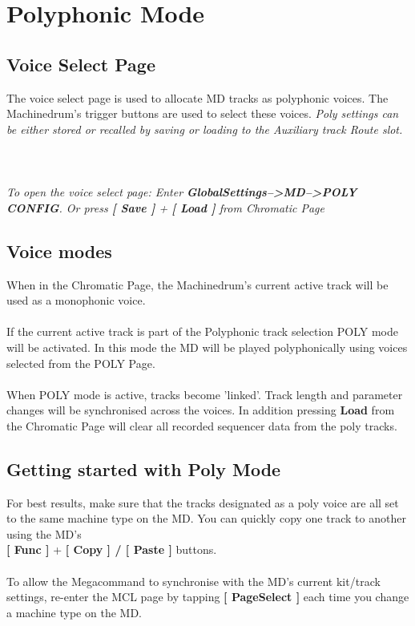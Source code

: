 \chapter{Polyphonic Mode}

\section{Voice Select Page}
The voice select page is used to allocate MD tracks as polyphonic voices.
The Machinedrum's trigger buttons are used to select these voices.
\textit{Poly settings can be either stored or recalled by saving or loading to the Auxiliary track Route slot.}\\\\
\\\\
\textit{To open the voice select page: Enter \textbf{GlobalSettings-->MD-->POLY CONFIG}. Or press \textbf{[ Save ]} + \textbf{[ Load ]} from  Chromatic Page}
\section{Voice modes}

When in the Chromatic Page, the Machinedrum's current active track will be used as a monophonic voice.\\
\\
If the current active track is part of the Polyphonic track selection POLY mode will be activated. In this mode the MD will be played polyphonically using voices selected from the POLY Page.\\
\\
When POLY mode is active, tracks become 'linked'. Track length and parameter changes will be synchronised across the voices. In addition pressing \textbf{Load} from the Chromatic Page will clear all recorded sequencer data from the poly tracks.
\section{Getting started with Poly Mode}
For best results, make sure that the tracks designated as a poly voice are all set to the same machine type on the MD. You can quickly copy one track to another using the MD's\\ \textbf{[ Func ]} + \textbf{[ Copy ] / [ Paste ]} buttons.\\\\
To allow the Megacommand to synchronise with the MD's current kit/track settings, re-enter the MCL page by tapping \textbf{[ PageSelect ]} each time you change a machine type on the MD.
\newpage
